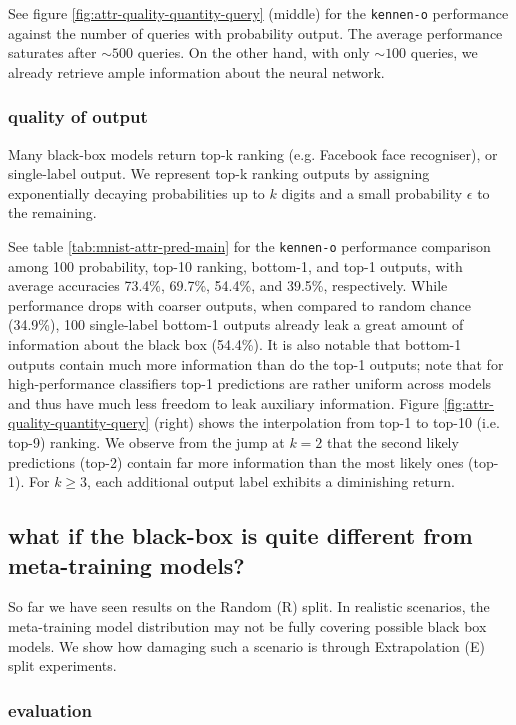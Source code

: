 \documentclass{article} %
\newcommand{\OR}{\texttt{kennen-o}\xspace}
\begin{document}
See figure \ref{fig:attr-quality-quantity-query} (middle) for the \OR performance against the number of queries with probability output. The average performance saturates after $\sim 500$ queries. On the other hand, with only $\sim 100$ queries, we already retrieve ample information about the neural network.

\subsubsection*{quality of output}

Many black-box models return top-k ranking (e.g. Facebook face recogniser), or single-label output. We represent top-k ranking outputs by assigning exponentially decaying probabilities up to $k$ digits and a small probability $\epsilon$ to the remaining.

See table \ref{tab:mnist-attr-pred-main} for the \OR performance comparison among 100 probability, top-10 ranking, bottom-1, and top-1 outputs, with average accuracies 73.4\%, 69.7\%, 54.4\%, and 39.5\%, respectively. While performance drops with coarser outputs, when compared to random chance (34.9\%), 100 single-label bottom-1 outputs already leak a great amount of information about the black box (54.4\%). It is also notable that bottom-1 outputs contain much more information than do the top-1 outputs; note that for high-performance classifiers top-1 predictions are rather uniform across models and thus have much less freedom to leak auxiliary information. Figure \ref{fig:attr-quality-quantity-query} (right) shows the interpolation from top-1 to top-10 (i.e. top-9) ranking. We observe from the jump at $k=2$ that the second likely predictions (top-2) contain far more information than the most likely ones (top-1). For $k\geq 3$, each additional output label exhibits a diminishing return.

\subsection{what if the black-box is quite different from meta-training models?}
\label{subsec:extrapolation}

So far we have seen results on the Random (R) split. In realistic scenarios, the meta-training model distribution may not be fully covering possible black box models. We show how damaging such a scenario is through Extrapolation (E) split experiments.

\subsubsection*{evaluation}
\end{document}
